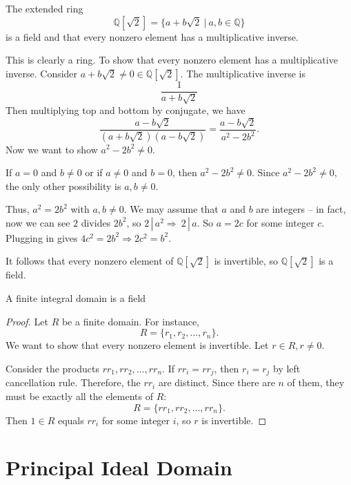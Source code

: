 \begin{example}
    The extended ring
    \[
        \mathbb{Q}[\sqrt{2}] = \{ a+b\sqrt{2} \> | \> a,b \in \mathbb{Q} \}
    \]
    is a field and that every nonzero element has a multiplicative inverse.
\end{example}
\begin{solution}
    This is clearly a ring. To show that every nonzero element has a multiplicative inverse. 
    Consider $a + b\sqrt{2} \neq 0 \in \mathbb{Q}[\sqrt{2}]$. The multiplicative inverse is 
    \[
        \frac{1}{a + b\sqrt{2}}
    \]
    Then multiplying top and bottom by conjugate, we have 
    \[
        \frac{a - b\sqrt{2}}{(a + b\sqrt{2})(a - b\sqrt{2})} = \frac{a - b\sqrt{2}}{a^2 - 2b^2}.
    \]
    Now we want to show $a^2 - 2b^2 \neq 0$.

    If $a = 0$ and $b \neq 0$ or if $a \neq 0$ and $b=0$, then $a^2 - 2b^2 \neq 0$. Since 
    $a^2 - 2b^2 \neq 0$, the only other possibility is $a, b \neq 0$.

    Thus, $a^2 = 2b^2$ with $a,b \neq 0$. We may assume that $a$ and $b$ are integers -- 
    in fact, now we can see $2$ divides $2b^2$, so $2 \,| \, a^2 \Longrightarrow \> 2 \, | \, a$. So 
    $a = 2c$ for some integer $c$. Plugging in gives $4c^2 = 2b^2 \Longrightarrow 2c^2 = b^2$.

    It follows that every nonzero element of $\mathbb{Q}[\sqrt{2}]$ is invertible, so 
    $\mathbb{Q}[\sqrt{2}]$ is a field.
\end{solution}

\begin{theorem}
    A finite integral domain is a field
\end{theorem}
\begin{proof}
    Let $R$ be a finite domain. For instance,
    \[
        R =\{ r_1, r_2, \ldots, r_n \}.
    \]
    We want to show that every nonzero element is invertible. Let $r \in R, r \neq 0$.

    Consider the products $rr_1, rr_2, \ldots, rr_n$. If $rr_i = rr_j$, then $r_i = r_j$ by 
    left cancellation rule. Therefore, the $rr_i$ are distinct. Since there are $n$ of them, 
    they must be exactly all the elements of $R$:
    \[
        R = \{ rr_1, rr_2, \ldots, rr_n \}.
    \]
    Then $1 \in R$ equals $rr_i$ for some integer $i$, so $r$ is invertible.
\end{proof}

\section{Principal Ideal Domain}

